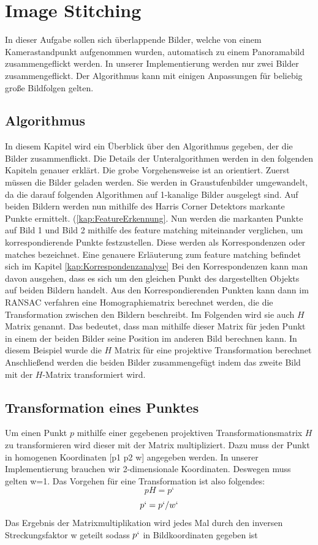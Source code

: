 \newcommand\todo[1]{
\newline
\textcolor{red}{#1}
}

\section{Image Stitching}
\label{sec:ImageStitching}
In dieser Aufgabe sollen sich überlappende Bilder, welche von einem Kamerastandpunkt aufgenommen wurden, automatisch zu einem Panoramabild zusammengeflickt werden. In unserer Implementierung werden nur zwei Bilder zusammengeflickt. Der Algorithmus kann mit einigen Anpassungen für beliebig große Bildfolgen gelten.
\subsection{Algorithmus}
In diesem Kapitel wird ein Überblick über den Algorithmus gegeben, der die Bilder zusammenflickt. Die Details der Unteralgorithmen werden in den folgenden Kapiteln genauer erklärt. Die grobe Vorgehensweise ist an \cite{Richard2000} orientiert. Zuerst müssen die Bilder geladen werden. Sie werden in Graustufenbilder umgewandelt, da die darauf folgenden Algorithmen auf 1-kanalige Bilder ausgelegt sind.
Auf beiden Bildern werden nun mithilfe des Harris Corner Detektors markante Punkte ermittelt. (\ref{kap:FeatureErkennung}. Nun werden die markanten Punkte auf Bild 1 und Bild 2 mithilfe des feature matching miteinander verglichen, um korrespondierende Punkte festzustellen. Diese werden als Korrespondenzen oder matches bezeichnet. Eine genauere Erläuterung zum feature matching befindet sich im Kapitel \ref{kap:Korrespondenzanalyse} Bei den Korrespondenzen kann man davon ausgehen, dass es sich um den gleichen Punkt des dargestellten Objekts auf beiden Bildern handelt.
Aus den Korrespondierenden Punkten kann dann im RANSAC verfahren eine Homographiematrix berechnet werden, die die Transformation zwischen den Bildern beschreibt. Im Folgenden wird sie auch $H$ Matrix genannt. Das bedeutet, dass man mithilfe dieser Matrix für jeden Punkt in einem der beiden Bilder seine Position im anderen Bild berechnen kann.  In diesem Beispiel wurde die $H$ Matrix für eine projektive Transformation berechnet
Anschließend werden die beiden Bilder zusammengefügt indem das zweite Bild mit der $H$-Matrix transformiert wird.

\subsection{Transformation eines Punktes}
Um einen Punkt $p$ mithilfe einer gegebenen projektiven Transformationsmatrix $H$ zu transformieren wird dieser mit der Matrix multipliziert. Dazu muss der Punkt in homogenen Koordinaten [p1 p2 w] angegeben werden. In unserer Implementierung brauchen wir 2-dimensionale Koordinaten. Deswegen muss gelten w=1. Das Vorgehen für eine Transformation ist also folgendes:
 $$p H=p‘$$
$$p`=p`/w`$$
Das Ergebnis der Matrixmultiplikation wird jedes Mal durch den inversen Streckungsfaktor w geteilt sodass $p`$ in Bildkoordinaten gegeben ist

